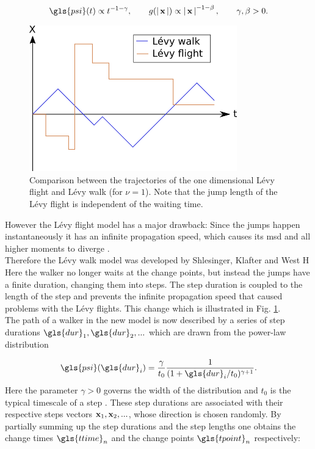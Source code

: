 \begin{align}
\gls{psi}(t) \propto t^{-1-\gamma}, \qquad g(\abs{\ve{x}}) \propto \abs{\ve{x}}^{-1-\beta}, \qquad \gamma, \beta > 0.
\end{align} 
%
\begin{figure}
\begin{center}
\includegraphics[width=90mm]{pics/levyFlight.png}
\caption{Comparison between the trajectories of the one dimensional L\'evy flight and L\'evy walk (for $\nu=1$). Note that the jump length of the L\'evy flight is independent of the waiting time. 
\label{fig:levyFlight}}
\end{center}
\end{figure}
%
However the L\'evy flight model has a major drawback: Since the jumps happen instantaneously it has an infinite propagation speed, which causes its \gls{msd} and all higher moments to diverge \cite{lwreview}. \\


Therefore the L\'evy walk model was developed by Shlesinger, Klafter and West \cite{shlesinger1987}H Here the walker no longer waits at the change points, but instead the jumps have a finite duration, changing them into steps. The step duration is coupled to the length of the step and prevents the infinite propagation speed that caused problems with the L\'evy flights. This change which is illustrated in Fig. \ref{fig:levyFlight}. \\

The path of a walker in the new model is now described by a series of step durations $\gls{dur}_1, \gls{dur}_2, ...$ which are drawn from the power-law distribution 

\begin{align}
\gls{psi}(\gls{dur}_i) = \frac{\gamma}{t_0} \frac{1}{(1+\gls{dur}_i/t_0)^{\gamma+1}} .
\label{eqn:defPsiT}
\end{align}
%
Here the parameter $\gamma>0$ governs the width of the distribution and { \color{blue}$t_0$ is the typical timescale of a step }. These step durations are associated with their respective steps vectors $\mathbf{ x }_1, \mathbf{ x }_2, ...$, whose direction is chosen randomly. By partially summing up the step durations and the step lengths one obtains the change times $\gls{ttime}_n$ and the change points $\gls{tpoint}_n$ respectively:

